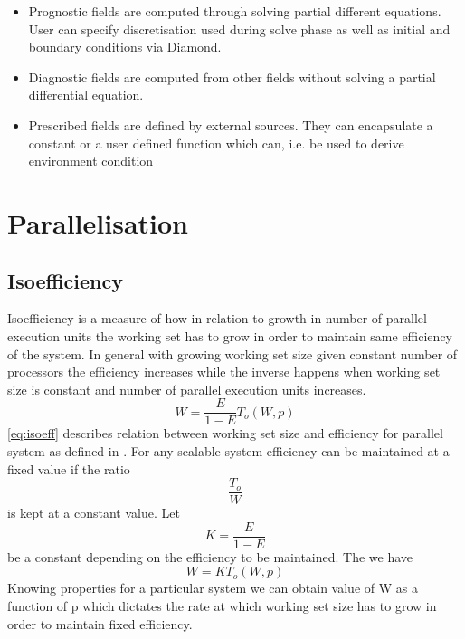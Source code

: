 \documentclass[12pt, a4paper]{report}
\begin{document}
\begin{itemize}
  \item Prognostic fields are computed through solving partial different equations.
    User can specify discretisation used during solve phase as well as initial and boundary
    conditions via Diamond.
  \item Diagnostic fields are computed from other fields without solving a
    partial differential equation.
  \item Prescribed fields are defined by external sources. They can encapsulate a constant
    or a user defined function which can, i.e. be used to derive environment condition
\end{itemize}

\section{Parallelisation}\label{sec:parallel}

\subsection{Isoefficiency}\label{sec:isoeff}

Isoefficiency is a measure of how in relation to growth in number of parallel execution units the working set has to grow in order to maintain same efficiency of the system. In general with growing working set size given constant number of processors the efficiency increases while the inverse happens when working set size is constant and number of parallel execution units increases.
\begin{equation}\label{eq:isoeff} W = \dfrac{E}{1-E}T_o(W,p) \end{equation}
\ref{eq:isoeff} describes relation between working set size and efficiency for parallel system as defined in \cite{grama2003introduction}.
For any scalable system efficiency can be maintained at a fixed value if the ratio \[\dfrac{T_o}{W}\] is kept at a constant value.
Let \[K = \dfrac{E}{1-E}\] be a constant depending on the efficiency to be maintained. The we have
\begin{equation}\label{eq:isoconst} W = KT_o(W,p) \end{equation} Knowing properties for a particular system we can obtain value of W
as a function of p which dictates the rate at which working set size has to grow in order to maintain fixed efficiency.
\end{document}

